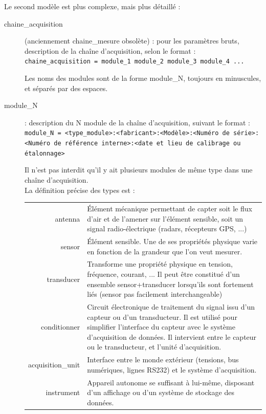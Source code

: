 Le second modèle est plus complexe, mais plus détaillé :
\begin{description}
   \item[chaine\_acquisition] (anciennement chaine\_mesure obsolète) : pour les paramètres bruts, description de la chaîne 
d'acquisition, selon le format : \\
\texttt{chaine\_acquisition = module\_1 module\_2 module\_3 module\_4 ...}

Les noms des modules sont de la forme module\_N, toujours en minuscules,
et séparés par des espaces.

   \item[module\_N] : description du N module de la chaîne
     d'acquisition, suivant le format : \\
     \texttt{module\_N = <type\_module>:<fabricant>:<Modèle>:<Numéro de série>:<Numéro de référence interne>:<date et lieu de calibrage ou étalonnage>}

\smallbreak
Il n'est pas interdit qu'il y ait plusieurs modules de même
type dans une chaîne d'acquisition.\\

\smallbreak
La définition précise des types est : \\
  \begin{tabular}{rp{10cm}}
    antenna & Élément mécanique permettant de capter
    soit le flux d'air et de l'amener sur l'élément sensible,
    soit un signal radio-électrique (radars, récepteurs GPS, ...) \\
    
    sensor & Élément sensible. Une de ses propriétés physique varie en fonction
    de la grandeur que l'on veut mesurer. \\
    
    transducer & Transforme une propriété physique en tension, fréquence, 
    courant, ... Il peut être constitué d'un ensemble sensor+transducer 
    lorsqu'ils sont fortement liés (sensor pas facilement interchangeable) \\
    
    conditionner & Circuit électronique de traitement du signal issu 
    d'un capteur ou d'un transducteur. Il est utilisé pour simplifier l'interface
    du capteur avec le système d'acquisition de données. Il intervient entre le 
    capteur ou le transducteur, et l'unité d'acquisition. \\
    
    acquisition\_unit & Interface entre le monde extérieur (tensions, bus 
    numériques, lignes RS232) et le système d'acquisition.\\
    
    instrument & Appareil autonome se suffisant à lui-même, disposant 
    d'un affichage ou d'un système de stockage des données.\\
  \end{tabular}
\end{description}

